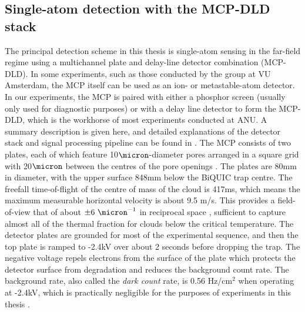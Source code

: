 \subsection*{Single-atom detection with the MCP-DLD stack}
	The principal detection scheme in this thesis is single-atom sensing in the far-field regime using a multichannel plate and delay-line detector combination (MCP-DLD). In some experiments, such as those conducted by the \mhe group at VU Amsterdam, the MCP itself can be used as an ion- or metastable-atom detector. In our experiments, the MCP is paired with either a phosphor screen (usually only used for diagnostic purposes) or with a delay line detector to form the MCP-DLD, which is the workhorse of most experiments conducted at ANU. A summary description is given here, and detailed explanations of the detector stack and signal processing pipeline can be found in \cite{ShinThesis, HodgmanThesis, ManningThesis}. The MCP consists of two plates, each of which feature 10$\micron$-diameter pores arranged in a square grid with 20$\micron$ between the centres of the pore openings . The plates are 80mm in diameter, with the upper surface 848mm below the BiQUIC trap centre. The freefall time-of-flight of the centre of mass of the cloud is 417ms, which means the maximum measurable horizontal velocity is about 9.5 m/s. This provides a field-of-view that of about $\pm6~\micron^{-1}$ in reciprocal space , sufficient to capture almost all of the thermal fraction for clouds below the critical temperature. The detector plates are grounded for most of the experimental sequence, and then the top plate is ramped to -2.4kV over about 2 seconds before dropping the trap. The negative voltage repels electrons from the surface of the plate which protects the detector surface from degradation and reduces the background count rate. The background rate, also called the \emph{dark count} rate, is 0.56 Hz/cm$^2$ when operating at -2.4kV, which is practically negligible for the purposes of experiments in this thesis . 

